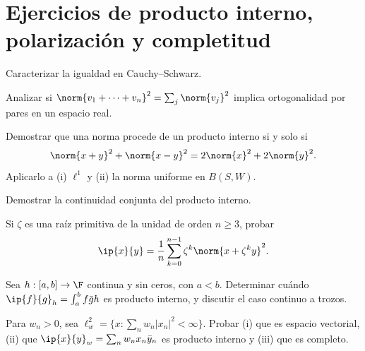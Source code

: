 \section{Ejercicios de producto interno, polarización y completitud}

\begin{ejercicio}\label{ej:lectura-29-1}
Caracterizar la igualdad en Cauchy--Schwarz.
\end{ejercicio}


\begin{ejercicio}\label{ej:lectura-29-2}
Analizar si $\norm{v_1+\cdots+v_n}^{2}=\sum_j\norm{v_j}^{2}$ implica ortogonalidad por pares en un espacio real.
\end{ejercicio}


\begin{ejercicio}\label{ej:lectura-29-3}
Demostrar que una norma procede de un producto interno si y solo si
\[
 \norm{x+y}^{2}+\norm{x-y}^{2}=2\norm{x}^{2}+2\norm{y}^{2}.
\]
Aplicarlo a (i) $\ell^{1}$ y (ii) la norma uniforme en $B(S,W)$.
\end{ejercicio}


\begin{ejercicio}\label{ej:lectura-29-4}
Demostrar la continuidad conjunta del producto interno.
\end{ejercicio}


\begin{ejercicio}\label{ej:lectura-29-5}
Si $\zeta$ es una raíz primitiva de la unidad de orden $n\geq3$, probar
\[
 \ip{x}{y}=\frac1n\sum_{k=0}^{n-1}\zeta^k\norm{x+\zeta^ky}^{2}.
\]
\end{ejercicio}


\begin{ejercicio}\label{ej:lectura-29-6}
Sea $h:[a,b]\to\F$ continua y sin ceros, con $a<b$. Determinar cuándo $\ip{f}{g}_h=\int_a^b f\bar g h$ es producto interno, y discutir el caso continuo a trozos.
\end{ejercicio}


\begin{ejercicio}\label{ej:lectura-29-7}
Para $w_n>0$, sea $\ell^{2}_w=\{x:\sum_n w_n|x_n|^{2}<\infty\}$. Probar (i) que es espacio vectorial, (ii) que $\ip{x}{y}_w=\sum_nw_nx_n\bar y_n$ es producto interno y (iii) que es completo.
\end{ejercicio}


